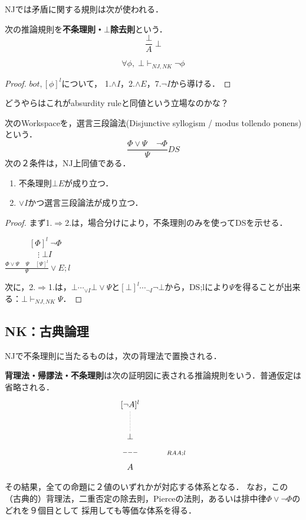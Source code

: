 \documentclass[uplatex, 12pt, dvipdfmx]{jsreport}
\begin{document}
NJでは矛盾に関する規則は次が使われる．
\begin{definition}
    次の推論規則を\textbf{不条理則・$\bot$除去則}という．
    \[ \frac{\bot}{A}\;\bot \]
\end{definition}

\begin{proposition}[ARよりも弱い命題なら常に成り立つ]
    \[\forall\phi,\;\bot\vdash_{NJ,NK}\lnot\phi\]
\end{proposition}
\begin{proof}$bot,[\phi]^l$について，
    1.$\land I$，2.$\land E$，7.$\lnot I$から導ける．
\end{proof}
\begin{remark}
    どうやら\cite{論理と計算のしくみ}はこれがabsurdity ruleと同値という立場なのかな？
\end{remark}

\begin{proposition}[ARの妥当性]
    次のWorkspaceを，選言三段論法(Disjunctive syllogism / modus tollendo ponens)という．
    \[\frac{\Phi\lor\Psi\;\;\;\;\lnot\Phi}{\Psi}DS\]
    次の２条件は，NJ上同値である．
    \begin{enumerate}
        \item 不条理則$\bot E$が成り立つ．
        \item $\lor I$かつ選言三段論法が成り立つ．
    \end{enumerate}
\end{proposition}
\begin{proof}
    まず1.$\Rightarrow$2.は，場合分けにより，不条理則のみを使ってDSを示せる．

    　　　$[\Phi]^l\;\lnot\Phi$\\
    　　　　$\vdots\;\bot I$\\
    $\frac{\Phi\lor\Psi\;\;\;\;\Psi\;\;\;\;[\Psi]^l}{\Psi}\lor E;l$
    
    次に，2.$\Rightarrow$1.は，$\bot\cdots_{\lor I}\bot\lor\Psi$と$[\bot]^l\cdots_{\lnot I}\lnot\bot$から，DS;lにより$\Psi$を得ることが出来る：$\bot\vdash_{NJ,NK}\Psi$．
\end{proof}

\subsection{NK：古典論理}

NJで不条理則に当たるものは，次の背理法で置換される．
\begin{definition}
    \textbf{背理法・帰謬法・不条理則}は次の証明図に表される推論規則をいう．普通仮定は省略される．
    \[
        \xymatrix{
            {[\lnot A]^l}\ar@{.}[d]\\{\bot}\ar@{}[d]|{---}&{}\ar@{}[d]^-{RAA;l}
            \\A&{}
        }
    \]
\end{definition}
その結果，全ての命題に２値のいずれかが対応する体系となる．
なお，この（古典的）背理法，二重否定の除去則，Pierceの法則，あるいは排中律$\Phi\lor\lnot\Phi$のどれを９個目として
採用しても等価な体系を得る．
\end{document}

